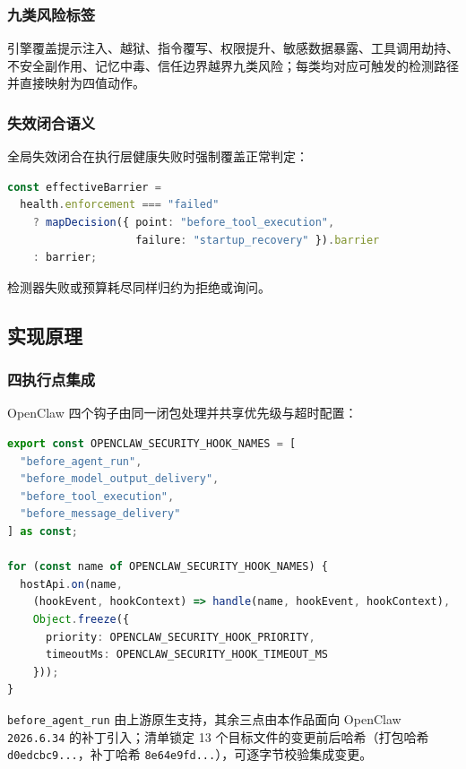 \subsubsection{九类风险标签}

引擎覆盖提示注入、越狱、指令覆写、权限提升、敏感数据暴露、工具调用劫持、不安全副作用、记忆中毒、信任边界越界九类风险；每类均对应可触发的检测路径并直接映射为四值动作。

\subsubsection{失效闭合语义}

全局失效闭合在执行层健康失败时强制覆盖正常判定：

\begin{lstlisting}[language=TypeScript, caption={全局失效闭合覆盖（\texttt{plugin.ts}）}]
const effectiveBarrier =
  health.enforcement === "failed"
    ? mapDecision({ point: "before_tool_execution",
                    failure: "startup_recovery" }).barrier
    : barrier;
\end{lstlisting}

检测器失败或预算耗尽同样归约为拒绝或询问。

\subsection{实现原理}

\subsubsection{四执行点集成}

OpenClaw 四个钩子由同一闭包处理并共享优先级与超时配置：

\begin{lstlisting}[language=TypeScript, caption={四执行点注册（\texttt{plugin.ts}）}]
export const OPENCLAW_SECURITY_HOOK_NAMES = [
  "before_agent_run",
  "before_model_output_delivery",
  "before_tool_execution",
  "before_message_delivery"
] as const;

for (const name of OPENCLAW_SECURITY_HOOK_NAMES) {
  hostApi.on(name,
    (hookEvent, hookContext) => handle(name, hookEvent, hookContext),
    Object.freeze({
      priority: OPENCLAW_SECURITY_HOOK_PRIORITY,
      timeoutMs: OPENCLAW_SECURITY_HOOK_TIMEOUT_MS
    }));
}
\end{lstlisting}

\verb|before_agent_run| 由上游原生支持，其余三点由本作品面向 OpenClaw \verb|2026.6.34| 的补丁引入；清单锁定 13 个目标文件的变更前后哈希（打包哈希 \verb|d0edcbc9...|，补丁哈希 \verb|8e64e9fd...|），可逐字节校验集成变更。

